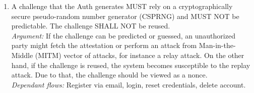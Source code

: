\begin{enumerate}
                \item A challenge that the Auth generates MUST rely on a cryptographically secure pseudo-random number 
                    generator (CSPRNG) and MUST NOT be predictable. The challenge SHALL NOT be reused.\\
                \textit{Argument:} If the challenge can be predicted or guessed, an unauthorized party might fetch the
                                attestation or perform an attack from Man-in-the-Middle (MITM) vector of attacks, for
                                instance a relay attack. On the other hand, if the challenge is reused, the system 
                                becomes susceptible to the replay attack. Due to that, the challenge should be 
                                viewed as a nonce.\\
                \textit{Dependant flows:} Register via email, login, reset credentials, delete account.
        \end{enumerate}

